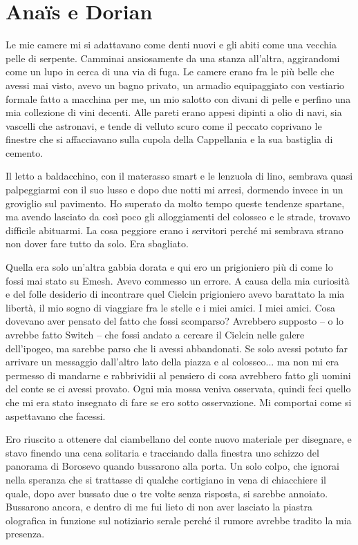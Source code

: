 \chapter{Anaïs e Dorian}

Le mie camere mi si adattavano come denti nuovi e gli abiti come una
vecchia pelle di serpente. Camminai ansiosamente da una stanza
all'altra, aggirandomi come un lupo in cerca di una via di fuga. Le
camere erano fra le più belle che avessi mai visto, avevo un bagno
privato, un armadio equipaggiato con vestiario formale fatto a macchina
per me, un mio salotto con divani di pelle e perfino una mia collezione
di vini decenti. Alle pareti erano appesi dipinti a olio di navi, sia
vascelli che astronavi, e tende di velluto scuro come il peccato
coprivano le finestre che si affacciavano sulla cupola della Cappellania
e la sua bastiglia di cemento.

Il letto a baldacchino, con il materasso smart e le lenzuola di lino,
sembrava quasi palpeggiarmi con il suo lusso e dopo due notti mi arresi,
dormendo invece in un groviglio sul pavimento. Ho superato da molto
tempo queste tendenze spartane, ma avendo lasciato da così poco gli
alloggiamenti del colosseo e le strade, trovavo difficile abituarmi. La
cosa peggiore erano i servitori perché mi sembrava strano non dover fare
tutto da solo. Era sbagliato.

Quella era solo un'altra gabbia dorata e qui ero un prigioniero più di
come lo fossi mai stato su Emesh. Avevo commesso un errore. A causa
della mia curiosità e del folle desiderio di incontrare quel Cielcin
prigioniero avevo barattato la mia libertà, il mio sogno di viaggiare
fra le stelle e i miei amici. I miei amici. Cosa dovevano aver pensato
del fatto che fossi scomparso? Avrebbero supposto -- o lo avrebbe fatto
Switch -- che fossi andato a cercare il Cielcin nelle galere
dell'ipogeo, ma sarebbe parso che li avessi {abbandonati}. Se solo
avessi potuto far arrivare un messaggio dall'altro lato della piazza e
al colosseo... ma non mi era permesso di mandarne e rabbrividii al
pensiero di cosa avrebbero fatto gli uomini del conte se ci avessi
provato. Ogni mia mossa veniva osservata, quindi feci quello che mi era
stato insegnato di fare se ero sotto osservazione. Mi comportai come si
aspettavano che facessi.

Ero riuscito a ottenere dal ciambellano del conte nuovo materiale per
disegnare, e stavo finendo una cena solitaria e tracciando dalla
finestra uno schizzo del panorama di Borosevo quando bussarono alla
porta. Un solo colpo, che ignorai nella speranza che si trattasse di
qualche cortigiano in vena di chiacchiere il quale, dopo aver bussato
due o tre volte senza risposta, si sarebbe annoiato. Bussarono ancora, e
dentro di me fui lieto di non aver lasciato la piastra olografica in
funzione sul notiziario serale perché il rumore avrebbe tradito la mia
presenza.

